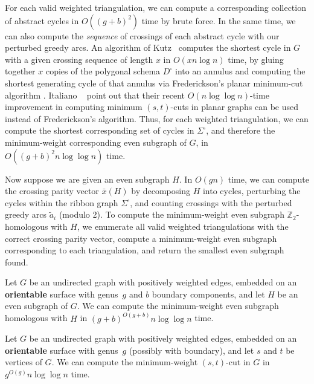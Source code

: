 \documentclass[letterpaper,review]{siamart190516}
\def\Z{\mathbb{Z}}
\def\rnote#1{\color{red}Review: #1 \color{black}}
\begin{document}
For each valid weighted triangulation, we can compute a corresponding collection of abstract cycles in $O((g+b)^2)$ time by brute force.  In the same time, we can also compute the \emph{sequence} of crossings of each abstract cycle with our perturbed greedy arcs.  An algorithm of Kutz~\cite{k-csnco-06} computes the shortest cycle in $G$ with a given crossing sequence of length $x$ in $O(x n \log n)$ time, by gluing together $x$ copies of the polygonal schema $D^\square$ into an annulus and computing the shortest generating cycle of that annulus via Frederickson's planar minimum-cut algorithm \cite{f-faspp-87}.
Italiano \etal~\cite{insw-iamcmf-11} point out that their recent $O(n \log \log n)$-time improvement in computing minimum $(s,t)$-cuts in planar graphs can be used instead of Frederickson's algorithm. 
Thus, for each weighted triangulation, we can compute the shortest corresponding set of cycles in $\Sigma^\square$, and therefore the minimum-weight corresponding even subgraph of $G$, in $O((g+b)^2 n \log \log n)$ time.


Now suppose we are given an even subgraph $H$.  In $O(gn)$ time, we can compute the crossing parity vector $\bar{x}(H)$ by decomposing $H$ into cycles, perturbing the cycles within the ribbon graph $\Sigma^\square$, and counting crossings with the perturbed greedy arcs $\tilde{a}_i$ (modulo 2).  To compute the minimum-weight even subgraph $\Z_2$-homologous with $H$, we enumerate all valid weighted triangulations with the correct crossing parity vector, compute a minimum-weight even subgraph corresponding to each triangulation, and return the smallest even subgraph found. 

\begin{theorem}
\label{Th:Z2-minimal-crossing}
Let $G$ be an undirected graph with positively weighted edges, embedded on an \textbf{orientable} surface with genus~$g$ and $b$ boundary components, and let $H$ be an even subgraph of $G$.  We can compute the minimum-weight even subgraph homologous with $H$ in $(g+b)^{O(g+b)} n\log \log n$ time.
\end{theorem}

\begin{corollary}
\label{C:min-cut-crossing}
Let $G$ be an undirected graph with positively weighted edges, embedded on an \textbf{orientable} surface with genus~$g$ (possibly with boundary), and let $s$ and $t$ be vertices of $G$.  We can compute the minimum-weight $(s,t)$-cut in $G$ in $g^{O(g)} n\log \log n$ time.
\end{corollary}
\end{document}
